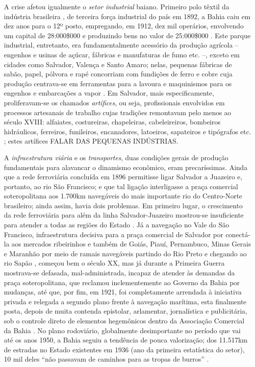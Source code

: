 A crise afetou igualmente o \textit{setor industrial} baiano. Primeiro polo têxtil da indústria brasileira \cite{OLIVEIRA1987, stein_textil_1979}, de terceira força industrial do país em 1892, a Bahia caiu em dez anos para o 12º posto, empregando, em 1912, dez mil operários, envolvendo um capital de 28:000\$000 e produzindo bens no valor de 25:000\$000 \cite[p.~29-30]{CPE1980}. Este parque industrial, entretanto, era fundamentalmente acessório da produção agrícola -- engenhos e usinas de açúcar, fábricas e manufaturas de fumo etc. --, exceto em cidades como Salvador, Valença e Santo Amaro; nelas, pequenas fábricas de sabão, papel, pólvora e rapé concorriam com fundições de ferro e cobre cuja produção centrava-se em ferramentas para a lavoura e maquinismos para os engenhos e embarcações a vapor \cite[p.~30]{CPE1980}. Em Salvador, mais especificamente, proliferavam-se os chamados \textit{artífices}, ou seja, profissionais envolvidos em processos artesanais de trabalho cujas tradições remontavam pelo menos ao século XVIII: alfaiates, costureiras, chapeleiras, cabeleireiros, bombeiros hidráulicos, ferreiros, funileiros, encanadores, latoeiros, sapateiros e tipógrafos etc. \cite{REIS2012}; estes artífices FALAR DAS PEQUENAS INDÚSTRIAS.

A \textit{infraestrutura viária} e os \textit{transportes}, duas condições gerais de produção fundamentais para alavancar o dinamismo econômico, eram precaríssimas. Ainda que a rede ferroviária concluída em 1896 permitisse ligar Salvador a Juazeiro e, portanto, ao rio São Francisco; e que tal ligação interligasse a praça comercial soteropolitana aos 1.700km navegáveis do mais importante rio do Centro-Norte brasileiro; ainda assim, havia dois problemas. Em primeiro lugar, o crescimento da rede ferroviária para além da linha Salvador-Juazeiro mostrou-se insuficiente para atender a todas as regiões do Estado \cite[p.~31]{CPE1980}. Já a navegação no Vale do São Francisco, infraestrutura decisiva para a praça comercial de Salvador por conectá-la aos mercados ribeirinhos e também de Goiás, Piauí, Pernambuco, Minas Gerais e Maranhão por meio de ramais navegáveis partindo do Rio Preto e chegando ao rio Sapão \cite[p.~220]{CUNHA2011}, começou bem o século XX, mas já durante a Primeira Guerra mostrava-se defasada, mal-administrada, incapaz de atender às demandas da praça soteropolitana, que reclamou inclementemente ao Governo da Bahia por mudanças, até que, por fim, em 1921, foi completamente arrendada à iniciativa privada e relegada a segundo plano frente à navegação marítima, esta finalmente posta, depois de muita contenda epistolar, arlamentar, jornalística e publicitária, sob o controle direto de elementos hegemônicos dentro da Associação Comercial da Bahia \cite[p.~221-223]{CUNHA2011}. No plano rodoviário, globalmente desimportante no período que vai até os anos 1950, a Bahia seguiu a tendência de pouca valorização; dos 11.517km de estradas no Estado existentes em 1936 (ano da primeira estatística do setor), 10 mil deles ``não passavam de caminhos para as tropas de burros'' \cite[p.~31]{CPE1980}.

